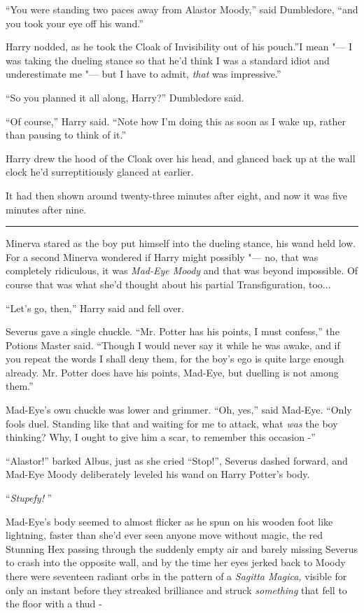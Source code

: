 ``You were standing two paces away from Alastor Moody,'' said
Dumbledore, ``and you took your eye off his wand.''

Harry nodded, as he took the Cloak of Invisibility out of his pouch.''I
mean "--- I was taking the dueling stance so that he'd think I was a
standard idiot and underestimate me "--- but I have to admit, \emph{that}
was impressive.''

``So you planned it all along, Harry?'' Dumbledore said.

``Of course,'' Harry said. ``Note how I'm doing this as soon as I wake
up, rather than pausing to think of it.''

Harry drew the hood of the Cloak over his head, and glanced back up at
the wall clock he'd surreptitiously glanced at earlier.

It had then shown around twenty-three minutes after eight, and now it
was five minutes after nine.

\begin{center}\rule{3in}{0.4pt}\end{center}

Minerva stared as the boy put himself into the dueling stance, his wand
held low. For a second Minerva wondered if Harry might possibly "--- no,
that was completely ridiculous, it was \emph{Mad-Eye Moody} and that was
beyond impossible. Of course that was what she'd thought about his
partial Transfiguration, too...

``Let's go, then,'' Harry said and fell over.

Severus gave a single chuckle. ``Mr. Potter has his points, I must
confess,'' the Potions Master said. ``Though I would never say it while
he was awake, and if you repeat the words I shall deny them, for the
boy's ego is quite large enough already. Mr. Potter does have his
points, Mad-Eye, but duelling is not among them.''

Mad-Eye's own chuckle was lower and grimmer. ``Oh, yes,'' said Mad-Eye.
``Only fools duel. Standing like that and waiting for me to attack, what
\emph{was} the boy thinking? Why, I ought to give him a scar, to
remember this occasion -''

``Alastor!'' barked Albus, just as she cried ``Stop!'', Severus dashed
forward, and Mad-Eye Moody deliberately leveled his wand on Harry
Potter's body.

``\emph{Stupefy!} ''

Mad-Eye's body seemed to almost flicker as he spun on his wooden foot
like lightning, faster than she'd ever seen anyone move without magic,
the red Stunning Hex passing through the suddenly empty air and barely
missing Severus to crash into the opposite wall, and by the time her
eyes jerked back to Moody there were seventeen radiant orbs in the
pattern of a \emph{Sagitta Magica,} visible for only an instant before
they streaked brilliance and struck \emph{something} that fell to the
floor with a thud -

